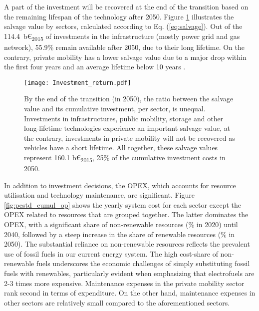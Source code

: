 A part of the investment will be recovered at the end of the transition based on the remaining lifespan of the technology after 2050. Figure \ref{fig:pestd_inv_return} illustrates the salvage value by sectors, calculated according to Eq. (\ref{eq:salvage}). Out of the 114.4~b€\textsubscript{2015} of investments in the infrastructure (\ie mostly power grid and gas network), 55.9\% remain available after 2050, due to their long lifetime. On the contrary, private mobility has a lower salvage value due to a major drop within the first four years and an average lifetime below 10 years \cite{febiac2021datadigest}. 


\begin{figure}[!htbp]
\centering
\texttt{[image: Investment\_return.pdf]}
\caption{By the end of the transition (\ie in 2050), the ratio between the salvage value and its cumulative investment, per sector, is unequal. Investments in infrastructures, public mobility, storage and other long-lifetime technologies experience an important salvage value, at the contrary, investments in private mobility will not be recovered as vehicles have a short lifetime. All together, these salvage values represent 160.1 b€\textsubscript{2015}, 25\% of the cumulative investment costs in 2050.}
\label{fig:pestd_inv_return}
\end{figure}

In addition to investment decisions, the \acrfull{OPEX}, which accounts for resource utilisation and technology maintenance, are significant. Figure \ref{fig:pestd_cumul_op} shows the yearly system cost for each sector except the \gls{OPEX} related to resources that are grouped together. The latter dominates the \gls{OPEX}, with a significant share of non-renewable resources (\% in 2020) until 2040, followed by a steep increase in the share of renewable resources (\% in 2050). The substantial reliance on non-renewable resources reflects the prevalent use of fossil fuels in our current energy system. The high cost-share of non-renewable fuels underscores the economic challenges of simply substituting fossil fuels with renewables, particularly evident when emphasizing that electrofuels are 2-3 times more expensive. Maintenance expenses in the private mobility sector rank second in terms of expenditure. On the other hand, maintenance expenses in other sectors are relatively small compared to the aforementioned sectors.

